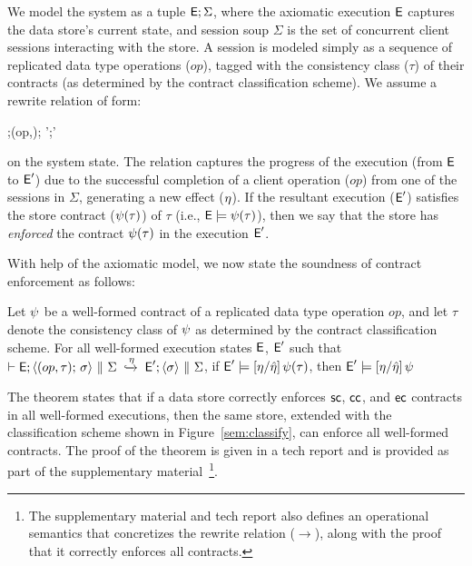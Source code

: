 We model the system as a tuple ${\normalfont \textsf{E}};\Sigma$, where the axiomatic execution ${\normalfont \textsf{E}}$
captures the data store's current state, and session soup $\Sigma$ is the
set of concurrent client sessions interacting with the store. A session is
modeled simply as a sequence of replicated data type operations
($\mathit{op}$), tagged with the consistency class ($\tau$) of their contracts
(as determined by the contract classification scheme). We assume a rewrite
relation of form:

\vspace{-1.7em}
\begin{smathpar}
  \auxred{} {\E;\langle (op,\tau);\sigma \rangle \pll \Sigma} {\eff}
    {\E';\langle \sigma \rangle \pll \Sigma'}
\end{smathpar}

\noindent on the system state. The relation captures the progress of
the execution (from ${\normalfont \textsf{E}}$ to ${\normalfont \textsf{E}}'$)  due to the successful completion
of a client operation ($\mathit{op}$) from one of the sessions in $\Sigma$,
generating a new effect ($\eta$). If the resultant execution (${\normalfont \textsf{E}}'$)
satisfies the store contract ($\psi(\tau)$) of $\tau$ (i.e., ${\normalfont \textsf{E}}
\models \psi(\tau)$), then we say that the store has \emph{enforced} the
contract $\psi(\tau)$ in the execution ${\normalfont \textsf{E}}'$.

With help of the axiomatic model, we now state the soundness of
contract enforcement as follows:

\begin{theorem}
\label{lem:core-preservation}
Let $\psi$ be a well-formed contract of a replicated data type operation $\mathit{op}$,
and let $\tau$ denote the consistency class of $\psi$ as determined by
the contract classification scheme. For all well-formed execution
states ${\normalfont \textsf{E}}$, ${\normalfont \textsf{E}}'$ such that
$\vdash {\normalfont \textsf{E}};\langle (op,\tau);\,\sigma \rangle ~\|~ \Sigma \;\xhookrightarrow{\eta}\; {\normalfont \textsf{E}}';\langle \sigma \rangle ~\|~ \Sigma$,
if ${\normalfont \textsf{E}}' \models [\eta/\hat{\eta}]\,\psi(\tau)$, then ${\normalfont \textsf{E}}' \models [\eta/\hat{\eta}]\,\psi$
\end{theorem}

\noindent The theorem states that if a data store correctly enforces ${\sf sc}$,
${\sf cc}$, and ${\sf ec}$ contracts in all well-formed executions, then the same
store, extended with the classification scheme shown in
Figure~\ref{sem:classify}, can enforce all well-formed \name contracts. The
proof of the theorem is given in a tech report and is provided as part of the
supplementary material~\cite{techrep}\footnote{The supplementary material and
tech report also defines an operational semantics that concretizes the rewrite
relation ($\xrightarrow{}$), along with the proof that it correctly enforces
all \name contracts.}.


